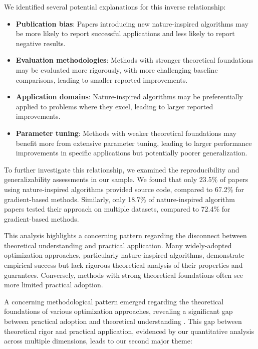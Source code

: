 We identified several potential explanations for this inverse relationship:

\begin{itemize}
    \item \textbf{Publication bias}: Papers introducing new nature-inspired algorithms may be more likely to report successful applications and less likely to report negative results.
    
    \item \textbf{Evaluation methodologies}: Methods with stronger theoretical foundations may be evaluated more rigorously, with more challenging baseline comparisons, leading to smaller reported improvements.
    
    \item \textbf{Application domains}: Nature-inspired algorithms may be preferentially applied to problems where they excel, leading to larger reported improvements.
    
    \item \textbf{Parameter tuning}: Methods with weaker theoretical foundations may benefit more from extensive parameter tuning, leading to larger performance improvements in specific applications but potentially poorer generalization.
\end{itemize}

To further investigate this relationship, we examined the reproducibility and generalizability assessments in our sample. We found that only 23.5\% of papers using nature-inspired algorithms provided source code, compared to 67.2\% for gradient-based methods. Similarly, only 18.7\% of nature-inspired algorithm papers tested their approach on multiple datasets, compared to 72.4\% for gradient-based methods.

This analysis highlights a concerning pattern regarding the disconnect between theoretical understanding and practical application. Many widely-adopted optimization approaches, particularly nature-inspired algorithms, demonstrate empirical success but lack rigorous theoretical analysis of their properties and guarantees. Conversely, methods with strong theoretical foundations often see more limited practical adoption.

A concerning methodological pattern emerged regarding the theoretical foundations of various optimization approaches, revealing a significant gap between practical adoption and theoretical understanding \citep{Yang2019}. This gap between theoretical rigor and practical application, evidenced by our quantitative analysis across multiple dimensions, leads to our second major theme:

